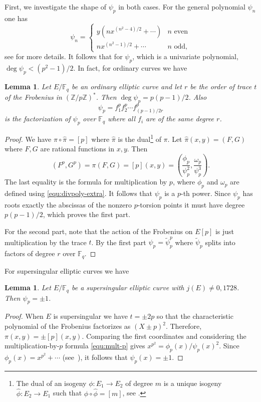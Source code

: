\documentclass[12pt]{article}
\theoremstyle{plain}
\newtheorem{lemma}[theorem]{Lemma}
\theoremstyle{definition}
\def\Z{\ensuremath{\mathbb{Z}}}
\def\F{\ensuremath{\mathbb{F}}}
\begin{document}
First, we investigate the shape of $\psi_p$ in both cases. For the general polynomial $\psi_n$ one 
has
\[
\psi_n =
\begin{cases}
	y(nx^{(n^2 - 4) / 2} + \cdots) & n \text{ even} \\
	nx^{(n^2 - 1) / 2} + \cdots & n \text{ odd},
\end{cases}
\]
see \cite{washington2008} for more details. It follows that for $\psi_p$, which is a univariate 
polynomial, $\deg \psi_p < (p^2 - 1) / 2$. In fact, for ordinary curves we have
\begin{lemma}
	\label{lem:ord_divpoly}
	Let $E/\F_q$ be an ordinary elliptic curve and let $r$ be the order of trace $t$ of the 
	Frobenius in $(\Z / p\Z)^*$. Then $\deg \psi_p = p(p - 1) / 2$. Also
	\[ \psi_p = f_1^pf_2^p \cdots f_{(p - 1) / 2r}^p \]
	is the factorization of $\psi_p$ over $\F_q$ where all $f_i$ are of the same degree $r$.
\end{lemma}
\begin{proof}
	We have $\pi \circ \hat{\pi} = [p]$ where $\hat{\pi}$ is the dual\footnote{The dual of an 
	isogeny $\phi: E_1 \rightarrow E_2$ of degree $m$ is a unique isogeny $\hat{\phi}: E_2 
	\rightarrow E_1$ such that $\phi \circ \hat{\phi} = [m]$, see  
	\cite[III.6]{silverman2009arithmetic}.} of $\pi$. Let $\hat{\pi}(x, y) = (F, G)$ where $F, G$ 
	are rational functions in $x, y$. Then
	\begin{equation}
	\label{equ:mult-p}
		(F^p, G^p) = \pi(F, G) = [p](x, y) = \left( \frac{\phi_p}{\psi_p^2}, 		
		\frac{\omega_p}{\psi_p^3} \right).
	\end{equation}
	The last equality is the formula for multiplication by $p$, where $\phi_p$ and $\omega_p$ are
	defined using \eqref{equ:divpoly-extra}. It follows that $\psi_p$ is a $p$-th power. Since 
	$\psi_p$ has roots exactly the abscissas of the nonzero $p$-torsion points it must have degree 
	$p(p - 1) / 2$, which proves the first part.
	
	For the second part, note that the action of the Frobenius on $E[p]$ is just multiplication by 
	the trace $t$. By the first part $\psi_p = \tilde{\psi}_p^p$ where $\tilde{\psi}_p$ splits into 
	factors of degree $r$ over $\F_q$.
\end{proof}
For supersingular elliptic curves we have
\begin{lemma}
	\label{lem:ss_divpoly}
	Let $E/\F_q$ be a supersingular elliptic curve with $j(E) \ne 0, 1728$. Then $\psi_p = \pm 1$.
\end{lemma}
\begin{proof}
	When $E$ is supersingular we have $t = \pm 2p$ so that the characteristic polynomial of the 
	Frobenius factorizes as $(X \pm p)^2$. Therefore, $\pi(x, y) = \pm [p](x, y)$. Comparing the 
	first coordinates and considering the multiplication-by-$p$ formula \eqref{equ:mult-p} gives 
	$x^{p^2} = \phi_p(x) / \psi_p(x)^2$. Since $\phi_p(x) = x^{p^2} + \cdots$	
	(see~\cite{washington2008}), it follows that $\psi_p(x) = \pm 1$.
\end{proof}
\end{document}
